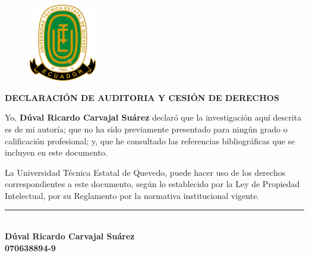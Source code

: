 \begin{center}
\begin{figure}[htb]
	\begin{center}
		\includegraphics[width=3.04cm,height=3.39cm]{img/logoUTEQ.png}
	\end{center}
\end{figure}

{\titulodc \textbf{DECLARACIÓN DE AUDITORIA Y CESIÓN DE DERECHOS}}

\end{center}
\vspace*{0.8in}
Yo, \textbf{Dúval Ricardo Carvajal Suárez} declaró que la investigación aquí descrita es de mi autoría; que no ha sido previamente presentado para ningún grado o calificación profesional; y, que he consultado las referencias bibliográficas que se incluyen en este documento.
 
La Universidad Técnica Estatal de Quevedo, puede hacer uso de los derechos correspondientes a este documento, según lo establecido por la Ley de Propiedad Intelectual, por su Reglamento por la normativa institucional vigente. 

\begin{center}
	\vspace*{2in}
	\rule{8cm}{0.1mm} \\
	 \textbf{Dúval Ricardo Carvajal Suárez \\
	 070638894-9}
\end{center}

